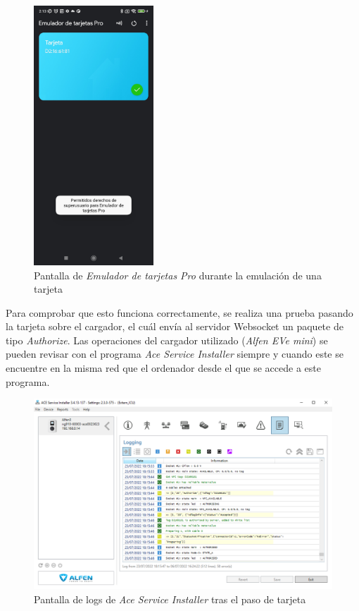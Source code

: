 \documentclass[12pt,a4paper,onecolumn,oneside]{report}
\begin{document}
\begin{figure}[h] 
\centering
  \includegraphics[width=0.4\textwidth]{figuras/root8.png}
  \caption[Pantalla de \textit{Emulador de tarjetas Pro} durante la emulación de una tarjeta]{Pantalla de \textit{Emulador de tarjetas Pro} durante la emulación de una tarjeta\\
  }
  \label{fig:root8}
\end{figure}

Para comprobar que esto funciona correctamente, se realiza una prueba pasando la tarjeta sobre el cargador, el cuál envía al servidor Websocket un paquete de tipo \textit{Authorize}. Las operaciones del cargador utilizado (\textit{Alfen EVe mini}) se pueden revisar con el programa \textit{Ace Service Installer} siempre y cuando este se encuentre en la misma red que el ordenador desde el que se accede a este programa.


\begin{figure}[h] 
\centering
  \includegraphics[width=1\textwidth]{figuras/authorize1.png}
  \caption[Pantalla de logs de \textit{Ace Service Installer} tras el paso de tarjeta]{Pantalla de logs de \textit{Ace Service Installer} tras el paso de tarjeta\\
  }
  \label{fig:authorize1}
\end{figure}
\end{document}

